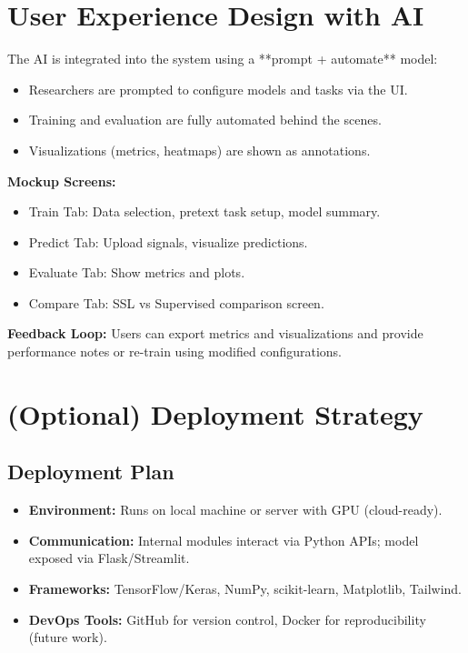 \section{User Experience Design with AI}
\label{sec:ux-ai}

The AI is integrated into the system using a **prompt + automate** model:
\begin{itemize}
    \item Researchers are prompted to configure models and tasks via the UI.
    \item Training and evaluation are fully automated behind the scenes.
    \item Visualizations (metrics, heatmaps) are shown as annotations.
\end{itemize}

\textbf{Mockup Screens:}
\begin{itemize}
    \item Train Tab: Data selection, pretext task setup, model summary.
    \item Predict Tab: Upload signals, visualize predictions.
    \item Evaluate Tab: Show metrics and plots.
    \item Compare Tab: SSL vs Supervised comparison screen.
\end{itemize}

\textbf{Feedback Loop:}
Users can export metrics and visualizations and provide performance notes or re-train using modified configurations.

\section{(Optional) Deployment Strategy}
\label{sec:deployment}

\subsection{Deployment Plan}
\begin{itemize}
    \item \textbf{Environment:} Runs on local machine or server with GPU (cloud-ready).
    \item \textbf{Communication:} Internal modules interact via Python APIs; model exposed via Flask/Streamlit.
    \item \textbf{Frameworks:} TensorFlow/Keras, NumPy, scikit-learn, Matplotlib, Tailwind.
    \item \textbf{DevOps Tools:} GitHub for version control, Docker for reproducibility (future work).
\end{itemize}

